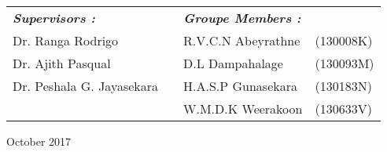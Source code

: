 \documentclass[12pt,a4paper,margin=1in]{article}
\begin{document}
\begin{titlepage}

\begin{flushleft}
\begin{tabular}{ l l l l}
\textbf{\textit{Supervisors :}} & &  \textbf{\textit{Groupe Members :}}\\[3pt]
Dr. Ranga Rodrigo & \hspace{20mm} & R.V.C.N Abeyrathne &(130008K)\\[2pt]
Dr. Ajith Pasqual & \hspace{20mm} & D.L Dampahalage & (130093M)\\[2pt]
Dr. Peshala G. Jayasekara & \hspace{20mm} & H.A.S.P Gunasekara & (130183N)\\[2pt]
\hspace{20mm} & \hspace{20mm} & W.M.D.K Weerakoon &(130633V)
\end{tabular}
\end{flushleft}

\vspace{2cm}
\fontsize{12pt}{12}\selectfont October 2017\\[1cm]


\vfill %

\end{titlepage}
\end{document}
